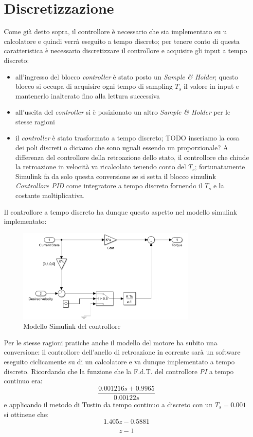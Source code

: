 \section{Discretizzazione}
Come già detto sopra, il controllore è necessario che sia implementato su u calcolatore e quindi verrà eseguito a tempo discreto; per tenere conto di questa caratteristica è necessario discretizzare il controllore e acquisire gli input a tempo discreto:
\begin{itemize}
	\item all'ingresso del blocco \textit{controller} è stato posto un \textit{Sample \& Holder}; questo blocco si occupa di acquisire ogni tempo di sampling $T_s$ il valore in input e mantenerlo inalterato fino alla lettura successiva
	\item all'uscita del \textit{controller} si è posizionato un altro \textit{Sample \& Holder} per le stesse ragioni
	\item il \textit{controller} è stato trasformato a tempo discreto; TODO inseriamo la cosa dei poli discreti o diciamo che sono uguali essendo un proporzionale?
	A differenza del controllore della retroazione dello stato, il controllore che chiude la retroazione in velocità va ricalcolato tenendo conto del $T_s$; fortunatamente Simulink fa da solo questa conversione se si setta il blocco simulink \textit{Controllore PID} come integratore a tempo discreto fornendo il $T_s$ e la costante moltiplicativa.
\end{itemize}
Il controllore a tempo discreto ha dunque questo aspetto nel modello simulink implementato:
\begin{figure}[H]
	\centering   	
	\includegraphics[width=0.8\textwidth]{Immagini/controller_discrete.png}
	\caption{Modello Simulink del controllore}
	\label{fig:controller_discrete}
\end{figure}

Per le stesse ragioni pratiche anche il modello del motore ha subito una conversione: il controllore dell'anello di retroazione in corrente sarà un software eseguito ciclicamente su di un calcolatore e va dunque implementato a tempo discreto.
Ricordando che la funzione che la F.d.T. del controllore \textit{PI} a tempo continuo era:
$$\dfrac{0.001216 s + 0.9965}{0.00122 s}$$
e applicando il metodo di Tustin da tempo continuo a discreto con un $T_s = 0.001$ si ottinene che:
$$\dfrac{1.405 z - 0.5881}{z - 1}$$


